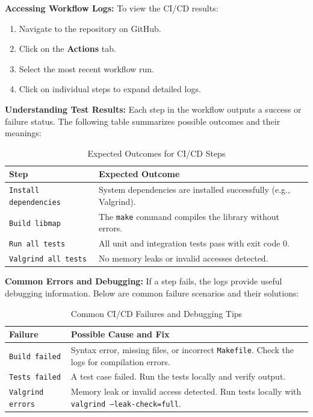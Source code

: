 \documentclass[titlepage]{article}
\begin{document}
\textbf{Accessing Workflow Logs:}  
To view the CI/CD results:  
\begin{enumerate}
    \item Navigate to the repository on GitHub.
    \item Click on the \textbf{Actions} tab.
    \item Select the most recent workflow run.
    \item Click on individual steps to expand detailed logs.
\end{enumerate}

\textbf{Understanding Test Results:}  
Each step in the workflow outputs a success or failure status. The following table summarizes possible outcomes and their meanings:

\begin{table}[h]
    \centering
    \renewcommand{\arraystretch}{1.3}
    \begin{tabular}{@{} l p{9cm} @{}}
        \toprule
        \textbf{Step} & \textbf{Expected Outcome} \\
        \midrule
        \texttt{Install dependencies} & System dependencies are installed successfully (e.g., Valgrind). \\
        \texttt{Build libmap} & The \texttt{make} command compiles the library without errors. \\
        \texttt{Run all tests} & All unit and integration tests pass with exit code 0. \\
        \texttt{Valgrind all tests} & No memory leaks or invalid accesses detected. \\
        \bottomrule
    \end{tabular}
    \caption{Expected Outcomes for CI/CD Steps}
\end{table}

\textbf{Common Errors and Debugging:}  
If a step fails, the logs provide useful debugging information. Below are common failure scenarios and their solutions:

\begin{table}[h]
    \centering
    \renewcommand{\arraystretch}{1.3}
    \begin{tabular}{@{} l p{9cm} @{}}
        \toprule
        \textbf{Failure} & \textbf{Possible Cause and Fix} \\
        \midrule
        \texttt{Build failed} & Syntax error, missing files, or incorrect \texttt{Makefile}. Check the logs for compilation errors. \\
        \texttt{Tests failed} & A test case failed. Run the tests locally and verify output. \\
        \texttt{Valgrind errors} & Memory leak or invalid access detected. Run tests locally with \texttt{valgrind --leak-check=full}. \\
        \bottomrule
    \end{tabular}
    \caption{Common CI/CD Failures and Debugging Tips}
\end{table}
\end{document}
